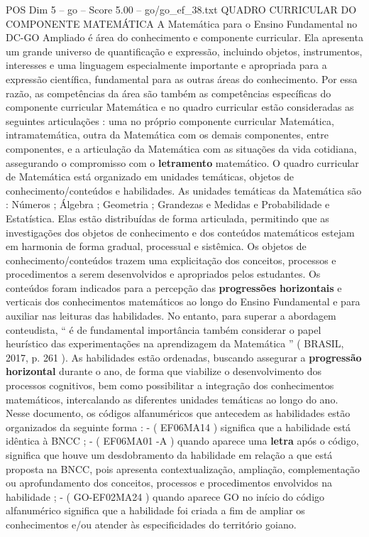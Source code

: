 \begin{textsample}{POS Dim 5 – go – Score 5.00 – go/go\_ef\_38.txt}  \label{ex:f5_pos_018}
QUADRO CURRICULAR DO COMPONENTE MATEMÁTICA A Matemática para o Ensino Fundamental no DC-GO Ampliado é área do conhecimento e componente curricular.
Ela apresenta um grande universo de quantificação e expressão, incluindo objetos, instrumentos, interesses e uma linguagem especialmente importante e apropriada para a expressão científica, fundamental para as outras áreas do conhecimento.
Por essa razão, as competências da área são também as competências específicas do componente curricular Matemática e no quadro curricular estão consideradas as seguintes articulações : uma no próprio componente curricular Matemática, intramatemática, outra da Matemática com os demais componentes, entre componentes, e a articulação da Matemática com as situações da vida cotidiana, assegurando o compromisso com o \textbf{letramento} matemático.
O quadro curricular de Matemática está organizado em unidades temáticas, objetos de conhecimento/conteúdos e habilidades.
As unidades temáticas da Matemática são : Números ; Álgebra ; Geometria ; Grandezas e Medidas e Probabilidade e Estatística.
Elas estão distribuídas de forma articulada, permitindo que as investigações dos objetos de conhecimento e dos conteúdos matemáticos estejam em harmonia de forma gradual, processual e sistêmica.
Os objetos de conhecimento/conteúdos trazem uma explicitação dos conceitos, processos e procedimentos a serem desenvolvidos e apropriados pelos estudantes.
Os conteúdos foram indicados para a percepção das \textbf{progressões} \textbf{horizontais} e verticais dos conhecimentos matemáticos ao longo do Ensino Fundamental e para auxiliar nas leituras das habilidades.
No entanto, para superar a abordagem conteudista, “ é de fundamental importância também considerar o papel heurístico das experimentações na aprendizagem da Matemática ” ( BRASIL, 2017, p. 261 ).
As habilidades estão ordenadas, buscando assegurar a \textbf{progressão} \textbf{horizontal} durante o ano, de forma que viabilize o desenvolvimento dos processos cognitivos, bem como possibilitar a integração dos conhecimentos matemáticos, intercalando as diferentes unidades temáticas ao longo do ano.
Nesse documento, os códigos alfanuméricos que antecedem as habilidades estão organizados da seguinte forma : - ( EF06MA14 ) significa que a habilidade está idêntica à BNCC ; - ( EF06MA01 -A ) quando aparece uma \textbf{letra} após o código, significa que houve um desdobramento da habilidade em relação a que está proposta na BNCC, pois apresenta contextualização, ampliação, complementação ou aprofundamento dos conceitos, processos e procedimentos envolvidos na habilidade ; - ( GO-EF02MA24 ) quando aparece GO no início do código alfanumérico significa que a habilidade foi criada a fim de ampliar os conhecimentos e/ou atender às especificidades do território goiano.

\end{textsample}
